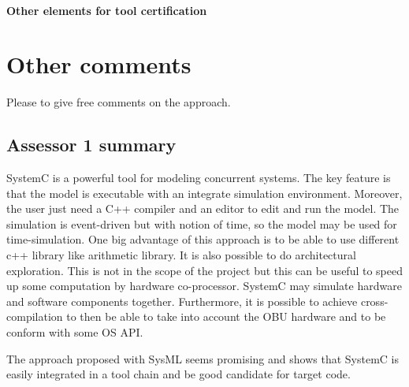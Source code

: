 \paragraph{Other elements for tool certification}

\section{Other comments}
Please to give free comments on the approach.

\subsection{Assessor 1 summary}
SystemC is a powerful tool for modeling concurrent systems. The key
feature is that the model is executable with  an integrate simulation
environment. Moreover, the user just need a C++ compiler and an editor
to edit and run the model. 
The simulation is event-driven but with notion of time, so the model
may be used for time-simulation.
One big advantage of this approach is to be able to use different c++
library like arithmetic library. It is also possible to do
architectural exploration. This is not in the scope of the project but
this can be useful to speed up some computation by hardware
co-processor. SystemC may simulate hardware and software components together.
Furthermore, it is possible to achieve cross-compilation to then be able
to take into account the OBU hardware and to be conform with some OS
API.

The approach proposed with SysML seems promising and shows that
SystemC is easily integrated in a tool chain and be good candidate for
target code.

